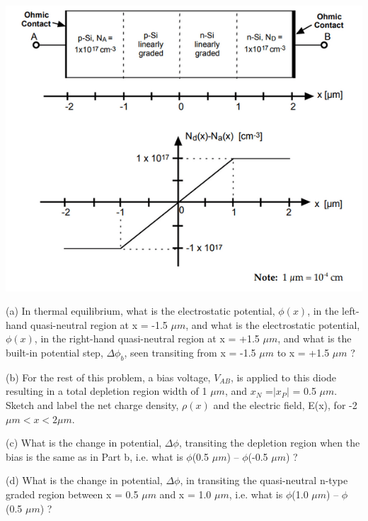 \documentclass[12 pt]{article}
\begin{document}
\par
\begin{center}
    \includegraphics{problem_2_1.png}
\end{center}
\par

(a) In thermal equilibrium, what is the electrostatic potential, $\phi (x)$, in the left-hand quasi-neutral region at x = -1.5 $\mu m$, and what is the electrostatic potential, $\phi (x)$, in the right-hand quasi-neutral region at x = +1.5 $\mu m$, and what is the built-in potential step, $\Delta \phi _{b}$, seen transiting from x = -1.5 $\mu m$ to x = +1.5 $\mu m$ ? \par

(b) For the rest of this problem, a bias voltage, $V_{AB}$, is applied to this diode resulting in a total depletion region width of 1 $\mu m$, and $x_{N}$ =$|x_{P}|$ = 0.5 $\mu m$. Sketch and label the net charge density, $\rho (x)$ and the electric field, E(x), for -2$\mu m < x < 2\mu m$. \par

(c) What is the change in potential, $\Delta \phi$, transiting the depletion region when the bias is the same as in Part b, i.e. what is $\phi$(0.5 $\mu m$) – $\phi$(-0.5 $\mu m$) ? \par

(d) What is the change in potential, $\Delta \phi$, in transiting the quasi-neutral n-type graded region between x = 0.5 $\mu m$ and x = 1.0 $\mu m$, i.e. what is $\phi$(1.0 $\mu m$) – $\phi $(0.5 $\mu m$) ? \par
\end{document}
